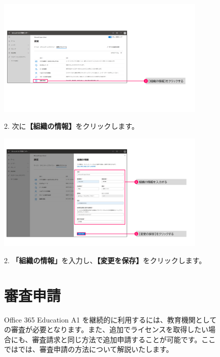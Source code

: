 \begin{figure}[h]
    \begin{minipage}{0.6\textwidth}
        \includegraphics[width=10cm]{figures/O365A1_profile02.png}
    \end{minipage}
    \begin{minipage}{0.4\textwidth}
       2. 次に\textbf{【組織の情報】}をクリックします。
    \end{minipage}
\end{figure}

\begin{figure}[h]
    \begin{minipage}{0.6\textwidth}
        \includegraphics[width=10cm]{figures/O365A1_profile03.png}
    \end{minipage}
    \begin{minipage}{0.4\textwidth}
       2. \textbf{「組織の情報」}を入力し、\textbf{【変更を保存】}をクリックします。
    \end{minipage}
    \vspace{6cm}
\end{figure}

\begin{figure}[h]
    \begin{minipage}{1.0\textwidth}
        \section{審査申請}
        \label{sec:審査申請}
        Office 365 Education A1 を継続的に利用するには、教育機関としての審査が必要となります。また、追加でライセンスを取得したい場合にも、審査請求と同じ方法で追加申請することが可能です。ここではでは、審査申請の方法について解説いたします。
    \end{minipage}
\end{figure}

